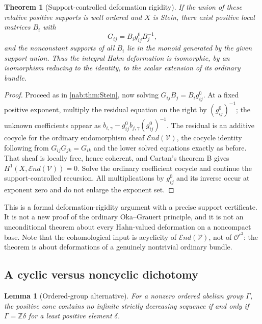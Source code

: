 \documentclass[11pt,letterpaper]{article}
\newtheorem{theorem}{Theorem}[section]
\newtheorem{lemma}[lemma]{Lemma}
\theoremstyle{definition}
\theoremstyle{remark}
\newcommand{\Z}{\mathbb Z}
\newcommand{\OO}{\mathcal O}
\newcommand{\Endsh}{\mathcal End}
\numberwithin{equation}{section}
\begin{document}
\begin{theorem}[Support-controlled deformation rigidity]
\label{nab:thm:deformation}
If the union of these relative positive supports is well ordered and $X$ is
Stein, there exist positive local matrices $B_i$ with
\begin{equation}\label{nab:eq:deformation}
 G_{ij}=B_ig^0_{ij}B_j^{-1},
\end{equation}
and the nonconstant supports of all $B_i$ lie in the monoid generated by the
given support union. Thus the integral Hahn deformation is isomorphic, by an
isomorphism reducing to the identity, to the scalar extension of its ordinary
bundle.
\end{theorem}

\begin{proof}
Proceed as in \cref{nab:thm:Stein}, now solving $G_{ij}B_j=B_ig^0_{ij}$. At a
fixed positive exponent, multiply the residual equation on the right by
$(g^0_{ij})^{-1}$; the unknown coefficients appear as
$b_{i,\gamma}-g^0_{ij}b_{j,\gamma}(g^0_{ij})^{-1}$. The residual is an
additive cocycle for the ordinary endomorphism sheaf $\Endsh(\mathcal V)$, the
cocycle identity following from $G_{ij}G_{jk}=G_{ik}$ and the lower solved
equations exactly as before. That sheaf is locally free, hence coherent, and
Cartan's theorem B gives $H^1(X,\Endsh(\mathcal V))=0$. Solve the ordinary
coefficient cocycle and continue the support-controlled recursion. All
multiplications by $g^0_{ij}$ and its inverse occur at exponent zero and do not
enlarge the exponent set.
\end{proof}

This is a formal deformation-rigidity argument with a precise support
certificate. It is not a new proof of the ordinary Oka--Grauert principle, and
it is not an unconditional theorem about every Hahn-valued deformation on a
noncompact base. Note that the cohomological input is acyclicity of
$\Endsh(\mathcal V)$, not of $\OO^{r^2}$: the theorem is about deformations of
a genuinely nontrivial ordinary bundle.

\subsection{A cyclic versus noncyclic dichotomy}

\begin{lemma}[Ordered-group alternative]\label{nab:lem:groups}
For a nonzero ordered abelian group $\Gamma$, the positive cone contains no
infinite strictly decreasing sequence if and only if $\Gamma=\Z\delta$ for a
least positive element $\delta$.
\end{lemma}
\end{document}
